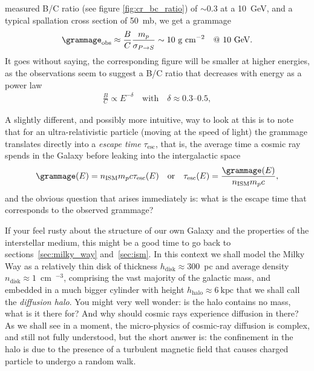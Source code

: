 measured B/C ratio (see figure \ref{fig:cr_bc_ratio}) of $\sim 0.3$ at a 10~GeV,
and a typical spallation cross section of 50~mb, we get a grammage
\begin{align*}
  \grammage_\text{obs} \approx \frac{B}{C} \frac{m_p}{\sigma_{P\rightarrow S}}
  \sim 10~\text{g~cm}^{-2} \quad @\ 10~\text{GeV}.
\end{align*}
It goes without saying, the corresponding figure will be smaller at higher
energies, as the observations seem to suggest a B/C ratio that decreases with
energy as a power law
\begin{align}
  \frac{B}{C} \propto E^{-\delta} \quad\text{with}\quad \delta \approx 0.3\text{--}0.5,
\end{align}

\begin{marginfigure}
  
  \caption{Energy dependence of the B/C ratio measured by AMS-02~\cite{2021PhR...894....1A}.
    The data are consistent with a power law in energy above a few GeV.}
  \label{fig:cr_bc_ratio}
\end{marginfigure}

A slightly different, and possibly more intuitive, way to look at this is to note that
for an ultra-relativistic particle (moving at the speed of light) the grammage translates
directly into a \emph{escape time} $\tau_\text{esc}$, that is, the average time a cosmic
ray spends in the Galaxy before leaking into the intergalactic space
\begin{align*}
  \grammage(E) = n_\text{ISM} m_p c \tau_\text{esc}(E) \quad\text{or}\quad
  \tau_\text{esc}(E) = \frac{\grammage(E)}{n_\text{ISM} m_p c},
\end{align*}
and the obvious question that arises immediately is: what is the escape time that
corresponds to the observed grammage?

If your feel rusty about the structure of our own Galaxy and the properties of the
interstellar medium, this might be a good time to go back to sections~\ref{sec:milky_way}
and~\ref{sec:ism}. In this context we shall model the Milky Way as a relatively thin disk
of thickness $h_\text{disk} \approx 300$~pc and average density
$n_\text{disk} \approx 1$~cm~$^{-3}$, comprising the vast majority of the galactic mass,
and embedded in a much bigger cylinder with height $h_\text{halo} \approx 6~\text{kpc}$
that we shall call the \emph{diffusion halo}.
You might very well wonder: is the halo contains no mass, what is it there for? And why
should cosmic rays experience diffusion in there? As we shall see in a moment, the
micro-physics of cosmic-ray diffusion is complex, and still not fully understood,
but the short answer is: the confinement in the halo is due to the presence of a
turbulent magnetic field that causes charged particle to undergo a random walk.


